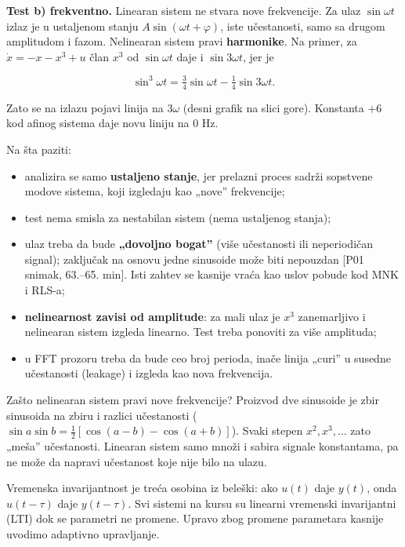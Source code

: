\documentclass[11pt,a4paper,parskip=half,headsepline,numbers=noenddot]{scrartcl}
\DeclareRobustCommand{\izvor}[1]{{\small\color{izvorC}[#1]}}
\begin{document}
\textbf{Test b) frekventno.} Linearan sistem ne stvara nove frekvencije. Za ulaz \(\sin\omega t\) izlaz je u ustaljenom stanju \(A\sin(\omega t + \varphi)\), iste učestanosti, samo sa drugom amplitudom i fazom. Nelinearan sistem pravi \textbf{harmonike}. Na primer, za \(\dot x = -x - x^3 + u\) član \(x^3\) od \(\sin\omega t\) daje i \(\sin 3\omega t\), jer je

\[\sin^3\omega t = \tfrac34\sin\omega t - \tfrac14\sin 3\omega t .\]

Zato se na izlazu pojavi linija na \(3\omega\) (desni grafik na slici gore). Konstanta \(+6\) kod afinog sistema daje novu liniju na 0 Hz.

Na šta paziti:

\begin{itemize}
\item analizira se samo \textbf{ustaljeno stanje}, jer prelazni proces sadrži sopstvene modove sistema, koji izgledaju kao „nove'' frekvencije;
\item test nema smisla za nestabilan sistem (nema ustaljenog stanja);
\item ulaz treba da bude \textbf{„dovoljno bogat''} (više učestanosti ili neperiodičan signal); zaključak na osnovu jedne sinusoide može biti nepouzdan \izvor{P01 snimak, 63.--65. min}. Isti zahtev se kasnije vraća kao uslov pobude kod MNK i RLS-a;
\item \textbf{nelinearnost zavisi od amplitude}: za mali ulaz je \(x^3\) zanemarljivo i nelinearan sistem izgleda linearno. Test treba ponoviti za više amplituda;
\item u FFT prozoru treba da bude ceo broj perioda, inače linija „curi'' u susedne učestanosti (leakage) i izgleda kao nova frekvencija.
\end{itemize}

\begin{zasto}
Zašto nelinearan sistem pravi nove frekvencije? Proizvod dve sinusoide je zbir sinusoida na zbiru i razlici učestanosti (\(\sin a\sin b = \tfrac12[\cos(a-b) - \cos(a+b)]\)). Svaki stepen \(x^2, x^3, \dots\) zato „meša'' učestanosti. Linearan sistem samo množi i sabira signale konstantama, pa ne može da napravi učestanost koje nije bilo na ulazu.
\end{zasto}

Vremenska invarijantnost je treća osobina iz beleški: ako \(u(t)\) daje \(y(t)\), onda \(u(t-\tau)\) daje \(y(t-\tau)\). Svi sistemi na kursu su linearni vremenski invarijantni (LTI) dok se parametri ne promene. Upravo zbog promene parametara kasnije uvodimo adaptivno upravljanje.
\end{document}
